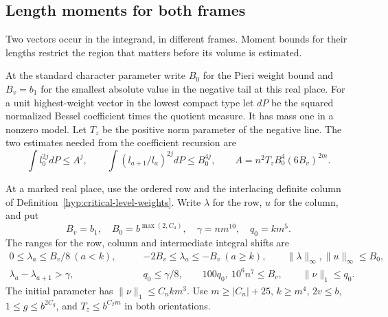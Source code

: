 \subsection{Length moments for both frames}

Two vectors occur in the integrand, in different frames. Moment bounds for their lengths restrict the region that matters before its volume is estimated.

At the standard character parameter write \(B_0\) for the
Pieri weight bound and \(B_v=b_1\) for the smallest absolute value in the negative tail at this real place.
For a unit highest-weight vector in the lowest compact type let
\(dP\) be the squared normalized Bessel coefficient times the
quotient measure. It has mass one in a nonzero model. Let
\(T_z\) be the positive norm parameter of the negative line.
The two
estimates needed from the coefficient recursion are
\[
 \int l_0^{2j}dP\le A^j,\qquad
 \int(l_{a+1}/l_a)^{2j}dP\le B_0^{4j},
 \qquad A=n^2 T_z B_0^4(6B_v)^{2m}.
\]

\begin{paramdefinition}\label{hyp:paired-frame-moment-range}
At a marked real place, use the ordered row and the interlacing
definite column of Definition~\ref{hyp:critical-level-weights}.
Write \(\lambda\) for the row, \(u\) for the column, and put
\[
  B_v=b_1,\quad B_0=b^{\max(2,C_u)},\quad
  \gamma=nm^{10},\quad q_0=km^5 .
\]
The ranges for the row, column and intermediate integral shifts are
\begin{align}
 0\le\lambda_a\le B_v/8\ (a<k),\qquad
 &-2B_v\le\lambda_a\le-B_v\ (a\ge k),\qquad
 \|\lambda\|_\infty,\|u\|_\infty\le B_0,\label{eq:marked-pieri-windows}\\
 \lambda_a-\lambda_{a+1}>\gamma,\qquad
 &q_0\le\gamma/8,\qquad 100q_0,\ 10^6n^7\le B_v,\qquad
 \|\nu\|_1\le q_0 .\nonumber
\end{align}
The initial parameter has \(\|\nu\|_1\le C_nkm^3\).
Use \(m\ge |C_n|+25\), \(k\ge m^4\), \(2v\le b\),
\(1\le g\le b^{2C_g}\), and \(T_z\le b^{C_Tm}\) in both orientations.
\end{paramdefinition}

